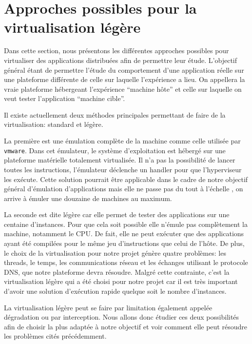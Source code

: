 \section{Approches possibles pour la virtualisation légère}
\label{section:emulation}

Dans cette section, nous présentons les différentes approches possibles pour
virtualiser des applications distribuées afin de permettre leur
étude. L'objectif général étant de permettre l'étude du comportement d'une
application réelle sur une plateforme différente de celle sur laquelle
l'expérience a lieu. On appellera la vraie plateforme hébergeant l'expérience
``machine hôte'' et celle sur laquelle on veut tester l'application ``machine cible''.

Il existe actuellement deux méthodes principales permettant de faire de la virtualisation: standard et légère.

La première est une émulation complète de la machine comme celle utilisée par
\texttt{vmware}. Dans cet émulateur, le système d'exploitation est hébergé sur une
plateforme matérielle totalement virtualisée. Il n'a pas la possibilité de
lancer toutes les instructions, l'émulateur déclenche un handler pour que
l'hyperviseur les exécute. Cette solution pourrait être applicable dans le cadre de notre objectif général d'émulation d'applications mais elle ne passe pas du tout
à l'échelle \citep{quetier2007scalability}, on arrive à émuler une douzaine de machines au maximum.

La seconde est dite légère car elle permet de tester des applications sur une
centaine d'instances. Pour que cela soit possible elle n'émule pas complètement
la machine, notamment le CPU. De fait, elle ne peut exécuter que des
applications ayant été compilées pour le même jeu d'instructions que celui de
l'hôte.  De plus, le choix de la virtualisation pour notre projet génère quatre
problèmes: les threads, le temps, les communications réseau et les échanges
utilisant le protocole DNS, que notre plateforme devra résoudre. Malgré cette
contrainte, c'est la virtualisation légère qui a été choisi pour notre projet
car il est très important d'avoir une solution d'exécution rapide quelque soit
le nombre d'instances.

La virtualisation légère peut se faire par limitation également appelée
dégradation ou par interception. Nous allons donc étudier ces deux possibilités
afin de choisir la plus adaptée à notre objectif et voir comment
elle peut résoudre les problèmes cités précédemment.









